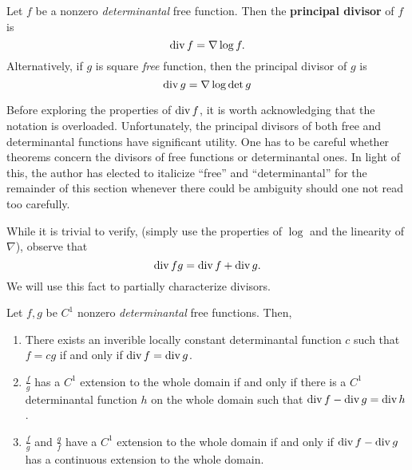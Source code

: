 \begin{definition}%
\label{def:princdiv}
Let \(f\) be a nonzero \emph{determinantal} free function. Then the
\textbf{principal divisor} of \(f\) is
\[
  \operatorname{div} f = \nabla \log f.
\]
Alternatively, if \(g\) is square \emph{free} function, then the principal divisor of
\(g\) is
\[
  \operatorname{div} g = \nabla \log \det g
\]
\end{definition}

Before exploring the properties of \(\operatorname{div} f\), it is worth acknowledging that
the notation is overloaded. Unfortunately, the principal divisors of both free
and determinantal functions have significant utility. One has to be careful
whether theorems concern the divisors of free functions or determinantal ones.
In light of this, the author has elected to italicize ``free'' and
``determinantal'' for the remainder of this section whenever there could be
ambiguity should one not read too carefully.

While it is trivial to verify, (simply use the properties of \(\log \) and the
linearity of \(\nabla\)), observe that
\[
  \operatorname{div} fg = \operatorname{div} f + \operatorname{div} g.
\]
We will use this fact to partially characterize divisors.

\begin{lemma}%
\label{lem:ob21}
  Let \(f,g\) be \(C^1\) nonzero \emph{determinantal} free functions. Then,
  \begin{enumerate}
    \item There exists an inverible locally constant determinantal function
          \(c\) such that \(f=cg\) if and only if \(\operatorname{div} f = \operatorname{div} g\).
    \item \(\frac{f}{g} \)  has a \(C^1\) extension to the whole domain if and
          only if there is a \(C^1\) determinantal function \(h\) on the whole
          domain such that \(\operatorname{div} f - \operatorname{div} g = \operatorname{div} h\).
    \item \(\frac{f}{g}\) and \(\frac{g}{f}\) have a \(C^1\) extension to the
          whole domain if and only if \(\operatorname{div} f - \operatorname{div} g\) has a continuous
          extension to the whole domain.
  \end{enumerate}
\end{lemma}

